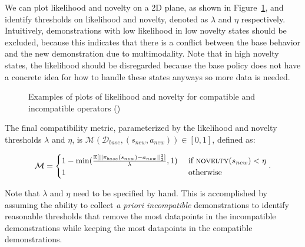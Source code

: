 \documentclass[
  letterpaper,
  numbers=noenddot,
  DIV=11,
  oneside]{scrreprt}
\theoremstyle{remark}
\begin{document}
We can plot likelihood and novelty on a 2D plane, as shown in
Figure~\ref{fig-likelihood_novelty}, and identify thresholds on
likelihood and novelty, denoted as \(\lambda\) and \(\eta\)
respectively. Intuitively, demonstrations with low likelihood in low
novelty states should be excluded, because this indicates that there is
a conflict between the base behavior and the new demonstration due to
multimodality. Note that in high novelty states, the likelihood should
be disregarded because the base policy does not have a concrete idea for
how to handle these states anyways so more data is needed.

\begin{figure}


\caption{\label{fig-likelihood_novelty}Examples of plots of likelihood
and novelty for compatible and incompatible operators
()}

\end{figure}%

The final compatibility metric, parameterized by the likelihood and
novelty thresholds \(\lambda\) and \(\eta\), is
\(\mathcal{M}(\mathcal{D}_{base}, (s_{new}, a_{new})) \in [0, 1]\),
defined as:

\[\begin{aligned}
    \mathcal{M} = \begin{cases} 
        1 - \min(\frac{\mathbb{E}[|| \pi_{base}(s_{new}) - a_{new} ||^2_2]}{\lambda}, 1) & \text{ if } \textsc{novelty}(s_{new}) < \eta \\
        1 & \text{ otherwise }
       \end{cases}.
\end{aligned}\]

Note that \(\lambda\) and \(\eta\) need to be specified by hand. This is
accomplished by assuming the ability to collect \emph{a priori
incompatible} demonstrations to identify reasonable thresholds that
remove the most datapoints in the incompatible demonstrations while
keeping the most datapoints in the compatible demonstrations.
\end{document}

